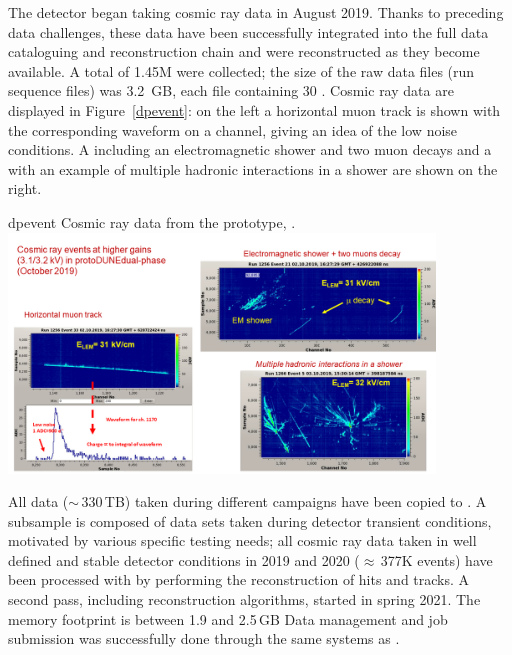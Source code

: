 \documentclass[../main-v1.tex]{subfiles}
\begin{document}
The  detector began taking cosmic ray data in August 2019. Thanks to preceding data challenges, these data have been successfully integrated into the full data cataloguing and reconstruction chain and were   reconstructed as they become available.
A total of 1.45M  were collected; the size of the raw data files (run sequence files) was 3.2 \,GB, each file containing 30 . Cosmic ray data are displayed in Figure~\ref{dpevent}: on
the left a horizontal muon track is shown with the corresponding waveform on a channel, giving an
idea of the low noise conditions. A  including an electromagnetic shower and two muon decays
and a  with an example of multiple hadronic interactions in a shower are shown on the right.


 
\begin{dunefigure}
{dpevent} %
{Cosmic ray data from the  prototype, .}
\includegraphics[width=0.85\textwidth]{graphics/IntroFigures/Fig_09_protodune-dp-event.png}
\end{dunefigure}


All data ($\sim$\,330\,TB) taken during different campaigns   have been copied to . A subsample is composed of data sets taken during detector transient conditions, motivated by various specific testing needs;  all cosmic ray data taken in well defined and stable detector conditions in 2019 and 2020 ($\approx$\,377K events) have been processed with  by performing the reconstruction of hits and \twod tracks. A second pass, including  reconstruction algorithms, started in spring 2021. 
The memory footprint is between 1.9 and 2.5\,GB
Data management and job submission was successfully done through the same systems as .
\end{document}
